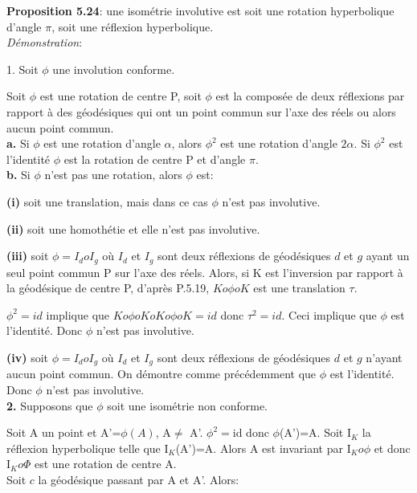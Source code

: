 \documentclass[a4paper, 12pt, twoside]{book}
\begin{document}
     
  \textbf{Proposition 5.24}: une isométrie involutive est soit une rotation hyperbolique d'angle $\pi$, soit une réflexion hyperbolique.\\
  
  \textit{Démonstration}: \
  
  1. Soit $\phi$ une involution conforme. \
  
  Soit $\phi$ est une rotation de centre P, soit $\phi$ est la composée de deux réflexions par rapport à des géodésiques qui ont un point commun sur l'axe des réels ou alors aucun point commun.\\
  
  \textbf{a.} Si $\phi$ est une rotation d'angle $\alpha$, alors $\phi^{2}$ est une rotation d'angle $2\alpha$. Si $\phi^{2}$ est l'identité $\phi$ est la rotation de centre P et d'angle $\pi$.\\
  
  \textbf{b.} Si $\phi$ n'est pas une rotation, alors $\phi$ est:\ 
  
  \textbf{(i)} soit une translation, mais dans ce cas $\phi$ n'est pas involutive.\
  
  \textbf{(ii)} soit une homothétie et elle n'est pas involutive.\
  
  \textbf{(iii)} soit $\phi=I_{d}oI_{g}$ où $I_{d}$ et $I_{g}$ sont deux réflexions de géodésiques $d$ et $g$ ayant un seul point commun P sur l'axe des réels. Alors, si K est l'inversion par rapport à la géodésique de centre P, d'après P.5.19, $Ko\phi oK$ est une translation $\tau$.\
  
  $\phi^{2}=id$ implique que $Ko\phi oKoKo\phi oK=id$  donc $\tau^{2}=id$. Ceci implique que $\phi$ est l'identité. Donc $\phi$ n'est pas involutive.\
  
  
  \textbf{(iv)} soit  $\phi=I_{d}oI_{g}$ où $I_{d}$ et $I_{g}$ sont deux réflexions de géodésiques $d$ et $g$ n'ayant aucun point commun. On démontre comme précédemment que $\phi$ est l'identité. Donc $\phi$ n'est pas involutive.\\
  
  \textbf{2.} Supposons que $\phi$ soit une isométrie non conforme.\
  
  Soit A un point et A'=$\phi(A)$, A$\neq$ A'. $\phi^{2}=$id donc $\phi$(A')=A. Soit I$_{K}$ la réflexion hyperbolique telle que I$_{K}$(A')=A. Alors A est invariant par I$_{K}o\phi$ et donc I$_{K}o\Phi$ est une rotation de centre A.\\
  
  Soit $c$ la géodésique passant par A et A'. Alors:\
  
\end{document}
